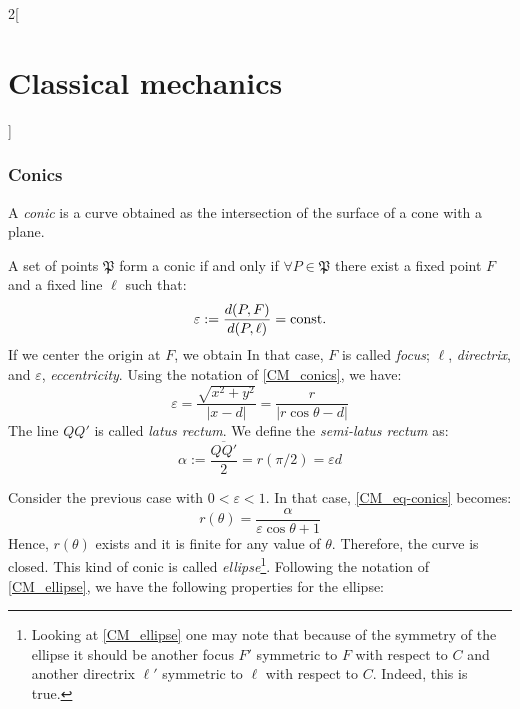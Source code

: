\documentclass[../../../main.tex]{subfiles}
\begin{document}
\begin{multicols}{2}[\section{Classical mechanics}]
  \subsubsection{Conics}
  \begin{definition}
    A \emph{conic} is a curve obtained as the intersection of the surface of a cone with a plane.
  \end{definition}
  \begin{proposition}
    A set of points $\mathfrak{P}$ form a conic if and only if $\forall P\in\mathfrak{P}$ there exist a fixed point $F$ and a fixed line $\ell$ such that: $$\varepsilon:=\frac{d(P,F)}{d(P,\ell)}=\text{const.}$$ If we center the origin at $F$, we obtain In that case, $F$ is called \emph{focus}; $\ell$, \emph{directrix}, and $\varepsilon$, \emph{eccentricity}. Using the notation of \cref{CM_conics}, we have:
    \begin{equation}\label{CM_eq-conics}
      \varepsilon=\frac{\sqrt{x^2+y^2}}{|x-d|}=\frac{r}{|r\cos\theta -d|}
    \end{equation}
    The line $QQ'$ is called \emph{latus rectum}. We define the \emph{semi-latus rectum} as: $$\alpha:=\frac{\overline{QQ'}}{2}=r(\pi/2)=\varepsilon d$$
    \begin{center}
      \begin{minipage}{\linewidth}
        \centering
        
        \label{CM_conics}
      \end{minipage}
    \end{center}
  \end{proposition}
  \begin{definition}
    Consider the previous case with $0<\varepsilon<1$. In that case, \cref{CM_eq-conics} becomes:
    \begin{equation}\label{CM_eq-ellipse}
      r(\theta)=\frac{\alpha}{\varepsilon\cos\theta+1}
    \end{equation}
    Hence, $r(\theta)$ exists and it is finite for any value of $\theta$. Therefore, the curve is closed. This kind of conic is called \emph{ellipse}\footnote{Looking at \cref{CM_ellipse} one may note that because of the symmetry of the ellipse it should be another focus $F'$ symmetric to $F$ with respect to $C$ and another directrix $\ell'$ symmetric to $\ell$ with respect to $C$. Indeed, this is true.}.
    Following the notation of \cref{CM_ellipse}, we have the following properties for the ellipse:

\end{definition}
\end{multicols}
\end{document}
